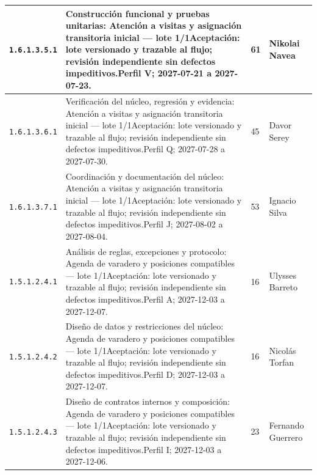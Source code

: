 \begin{longtable}{L{29mm}L{80mm}R{12mm}L{28mm}}
\texttt{1.\allowbreak{}6.\allowbreak{}1.\allowbreak{}3.\allowbreak{}5.\allowbreak{}1} & Construcción funcional y pruebas unitarias: Atención a visitas y asignación transitoria inicial — lote 1/1\newline Aceptación: lote versionado y trazable al flujo; revisión independiente sin defectos impeditivos.\newline Perfil V; 2027-07-21 a 2027-07-23. & 61 & Nikolai Navea\\\hline
\texttt{1.\allowbreak{}6.\allowbreak{}1.\allowbreak{}3.\allowbreak{}6.\allowbreak{}1} & Verificación del núcleo, regresión y evidencia: Atención a visitas y asignación transitoria inicial — lote 1/1\newline Aceptación: lote versionado y trazable al flujo; revisión independiente sin defectos impeditivos.\newline Perfil Q; 2027-07-28 a 2027-07-30. & 45 & Davor Serey\\\hline
\texttt{1.\allowbreak{}6.\allowbreak{}1.\allowbreak{}3.\allowbreak{}7.\allowbreak{}1} & Coordinación y documentación del núcleo: Atención a visitas y asignación transitoria inicial — lote 1/1\newline Aceptación: lote versionado y trazable al flujo; revisión independiente sin defectos impeditivos.\newline Perfil J; 2027-08-02 a 2027-08-04. & 53 & Ignacio Silva\\\hline
\texttt{1.\allowbreak{}5.\allowbreak{}1.\allowbreak{}2.\allowbreak{}4.\allowbreak{}1} & Análisis de reglas, excepciones y protocolo: Agenda de varadero y posiciones compatibles — lote 1/1\newline Aceptación: lote versionado y trazable al flujo; revisión independiente sin defectos impeditivos.\newline Perfil A; 2027-12-03 a 2027-12-07. & 16 & Ulysses Barreto\\\hline
\texttt{1.\allowbreak{}5.\allowbreak{}1.\allowbreak{}2.\allowbreak{}4.\allowbreak{}2} & Diseño de datos y restricciones del núcleo: Agenda de varadero y posiciones compatibles — lote 1/1\newline Aceptación: lote versionado y trazable al flujo; revisión independiente sin defectos impeditivos.\newline Perfil D; 2027-12-03 a 2027-12-07. & 16 & Nicolás Torfan\\\hline
\texttt{1.\allowbreak{}5.\allowbreak{}1.\allowbreak{}2.\allowbreak{}4.\allowbreak{}3} & Diseño de contratos internos y composición: Agenda de varadero y posiciones compatibles — lote 1/1\newline Aceptación: lote versionado y trazable al flujo; revisión independiente sin defectos impeditivos.\newline Perfil I; 2027-12-03 a 2027-12-06. & 23 & Fernando Guerrero\\\hline

\end{longtable}
